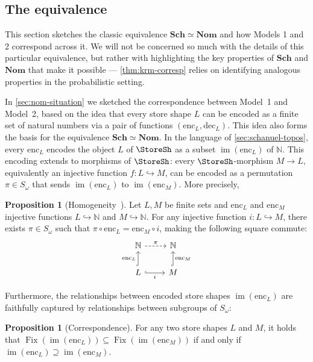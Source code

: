 \documentclass[
  sigconf,
  screen, ]{acmart}
\theoremstyle{definition}
\newtheorem{proposition}[theorem]{Proposition}
\newcommand\img{\operatorname{im}}
\newcommand\N{\mathbb N}
\newcommand\nref[2]{\hyperref[#1]{#2}} \newcommand\checkhigh{{\huge{\color{red}\textbf{TODO: check}}}}
\newcommand\Sch{{\nref{def:Sch}{\mathbf{Sch}}}}
\newcommand\enc{\mathrm{enc}}
\newcommand\dec{\mathrm{dec}}
\newcommand\nomgrp{{\nref{def:nomgrp}{S_\omega}}}
\newcommand\Nom{{\nref{def:Nom}{\mathbf{Nom}}}}
\newcommand\nomFix{\operatorname{\nref{def:nomFix}{Fix}}}
\begin{document}
\subsection{The equivalence} \label{sec:sch-nom} \label{sec:eqv-models-schnom}

This section sketches the classic equivalence $\Sch\simeq\Nom$
and how Models 1 and 2 correspond across it.
We will not be concerned so much with the details of this
particular equivalence, but rather with highlighting
the key properties of $\Sch$
and $\Nom$ that make it possible --- \cref{thm:krm-corresp}
relies on identifying analogous properties
in the probabilistic setting.

In \cref{sec:nom-situation} we sketched
the correspondence between Model~1 and Model~2,
based on the idea that every store shape $L$
can be encoded as a finite set of natural numbers
via a pair of functions $(\enc_L,\dec_L)$.
This idea also forms the basis for the
equivalence $\Sch\simeq\Nom$.
In the language of \cref{sec:schanuel-topos},
every $\enc_L$
encodes the object $L$ of $\StoreSh$
as a subset $\img(\enc_L)$ of $\N$.
This encoding extends to morphisms of $\StoreSh$:
every $\StoreSh$-morphism $M\to L$,
equivalently an injective function $f : L\hookrightarrow M$,
can be encoded as a permutation $\pi\in\nomgrp$
that sends $\img(\enc_L)$ to $\img(\enc_M)$.
More precisely,
\newcommand\Homogeneity{{\nref{lem:nom-homogeneity}{Homogeneity}}}
\begin{proposition}[Homogeneity~] \label{lem:nom-homogeneity}
  Let $L,M$ be finite sets and $\enc_L$ and $\enc_M$
  injective functions $L\hookrightarrow\N$ and $M\hookrightarrow\N$.
  For any injective function $i : L\hookrightarrow M$,
  there exists $\pi\in\nomgrp$
  such that $\pi\circ \enc_L = \enc_M \circ i$,
  making the following square commute:
    \[\begin{tikzcd}
    \N \arrow[r, "\pi", dashed]                 & \N                    \\
    L \arrow[u, "\enc_L", hook] \arrow[r, "i"', hook] & M \arrow[u, "\enc_M"', hook]
    \end{tikzcd}\]
\end{proposition}
Furthermore,
the relationships between encoded store shapes
$\img(\enc_L)$ are faithfully captured by
relationships between subgroups of $\nomgrp$:

\newcommand\Correspondence{{\nref{def:Correspondence}{Correspondence}}}
\begin{proposition}[Correspondence] \label{def:Correspondence}
    For any two store shapes $L$ and $M$,
    it holds that
    $\nomFix(\img(\enc_L))\subseteq\nomFix(\img(\enc_M))$
    if and only if $\img(\enc_L)\supseteq \img(\enc_M)$.
\end{proposition}
\end{document}
